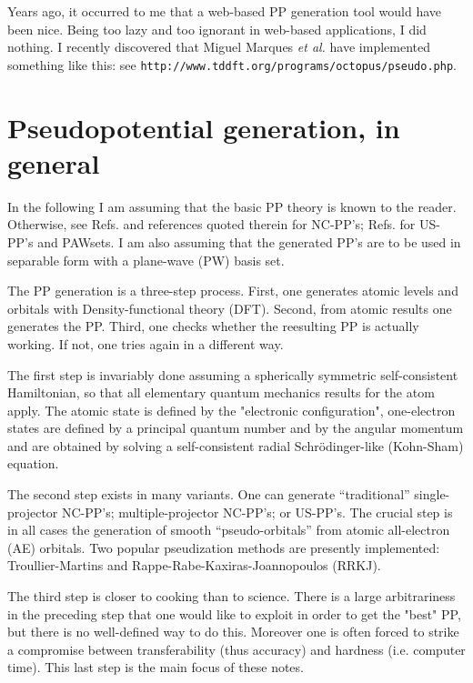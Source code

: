 \documentclass[12pt,a4paper]{article}
\begin{document}
Years ago, it occurred to me that a web-based PP generation
tool would have been nice. Being too lazy and too ignorant 
in web-based applications, I did nothing.
I recently discovered that Miguel Marques {\em et al.} have
implemented something like this: see
{\tt http://www.tddft.org/programs/octopus/pseudo.php}.

\section{Pseudopotential generation, in general} 

In the following I am assuming that the basic PP theory 
is known to the reader. Otherwise, see 
Refs.\cite{NC,BHS,TM,fhi98PP,RRKJ} and references quoted 
therein for NC-PP's; Refs.\cite{van,PAW} for US-PP's and PAWsets. 
I am also assuming that the generated PP's are to be used
in separable form \cite{KB} with a plane-wave (PW) basis set.

The PP generation is a three-step process. First, one generates
atomic levels and orbitals with Density-functional theory (DFT). 
Second, from atomic results one generates the PP. Third, one checks 
whether the reesulting PP is actually working. If not, one tries again in 
a different way.

The first step is invariably done assuming a spherically symmetric
self-consistent Hamiltonian, so that all elementary quantum mechanics 
results for the atom apply. The atomic state is defined by the
"electronic configuration", one-electron states are defined by a
principal quantum number and by the angular momentum and are obtained
by solving a self-consistent radial Schr\"odinger-like (Kohn-Sham)
equation.

The second step exists in many variants. One can generate ``traditional'' 
single-projector NC-PP's; multiple-projector NC-PP's; or US-PP's.
The crucial step is in all cases the generation of smooth
``pseudo-orbitals''  from atomic all-electron (AE) orbitals. 
Two popular pseudization
methods are presently implemented: Troullier-Martins \cite{TM}
and Rappe-Rabe-Kaxiras-Joannopoulos \cite{RRKJ} (RRKJ).

The third step is closer to cooking than to science. There is a
large arbitrariness in the preceding step that one would like to 
exploit in order to get the "best" PP, but there is no well-defined
way to do this. Moreover one is often forced to strike a compromise
between transferability (thus accuracy) and hardness (i.e. computer 
time). This last step is the main focus of these notes.
\end{document}
